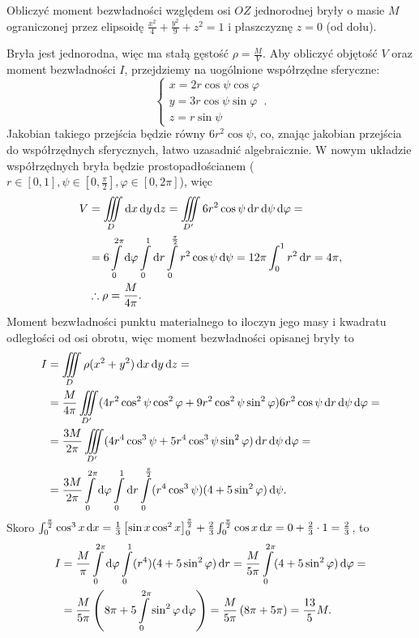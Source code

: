 \begin{example}
    Obliczyć moment bezwładności względem osi $OZ$ jednorodnej bryły o masie $M$ ograniczonej przez elipsoidę $\frac{x^2}{4} + \frac{y^2}{9} + z^2 = 1$ i płaszczyznę $z = 0$ (od dołu).
\end{example}
\begin{solution}
    Bryła jest jednorodna, więc ma stałą gęstość $\rho = \frac{M}{V}$. Aby obliczyć objętość $V$ oraz moment bezwładności $I$, przejdziemy na uogólnione współrzędne sferyczne:
    \[ \begin{cases}
        x = 2r\cos\psi\cos\varphi \\
        y = 3r\cos\psi\sin\varphi \\
        z = r\sin\psi
    \end{cases}. \]
    Jakobian takiego przejścia będzie równy $6r^2\cos\psi$, co, znając jakobian przejścia do współrzędnych sferycznych, łatwo uzasadnić algebraicznie. W nowym układzie współrzędnych bryła będzie prostopadłościanem ($r \in [0, 1], \psi \in [0, \frac{\pi}{2}], \varphi \in [0, 2\pi]$), więc
    \begin{align*}
        V &= \iiint\limits_D \d x \d y \d z = \iiint\limits_{D'} 6r^2\cos\psi \d r \d \psi \d \varphi = \\
        &= 6 \int\limits_0^{2\pi} \d \varphi \int\limits_0^1 \d r \int\limits_0^{\frac{\pi}{2}} r^2\cos\psi \d \psi = 12\pi \int_0^1 r^2 \d r = 4\pi, \\
        &\therefore \rho = \frac{M}{4\pi}.
    \end{align*}
    Moment bezwładności punktu materialnego to iloczyn jego masy i kwadratu odległości od osi obrotu, więc moment bezwładności opisanej bryły to
    \begin{align*}
        I &= \iiint\limits_D \rho (x^2 + y^2) \d x \d y \d z = \\
        &= \frac{M}{4\pi} \iiint\limits_{D'} (4r^2\cos^2\psi\cos^2\varphi + 9r^2\cos^2\psi\sin^2\varphi) 6r^2\cos\psi \d r \d \psi \d \varphi = \\
        &= \frac{3M}{2\pi} \iiint\limits_{D'} (4r^4\cos^3\psi + 5r^4\cos^3\psi\sin^2\varphi) \d r \d \psi \d \varphi = \\
        &= \frac{3M}{2\pi} \int\limits_0^{2\pi} \d \varphi \int\limits_0^1 \d r \int\limits_0^{\frac{\pi}{2}} (r^4\cos^3\psi)(4 + 5\sin^2\varphi) \d \psi.
    \end{align*}
    Skoro $\int_0^{\frac{\pi}{2}} \cos^3 x \operatorname{d}\!{x} = \frac{1}{3}\left[\sin x \cos^2 x\right]_0^{\frac{\pi}{2}} + \frac{2}{3}\int_0^{\frac{\pi}{2}} \cos x \operatorname{d}\!{x} = 0 + \frac{2}{3}\cdot 1 = \frac{2}{3}$, to
    \begin{align*}
        I &= \frac{M}{\pi} \int\limits_0^{2\pi} \operatorname{d}\!{\varphi} \int\limits_0^1 (r^4)(4 + 5\sin^2\varphi) \operatorname{d}\!{r} = \frac{M}{5\pi} \int\limits_0^{2\pi} (4 + 5\sin^2\varphi) \operatorname{d}\!{\varphi} = \\
        &= \frac{M}{5\pi}\left(8\pi + 5\int\limits_0^{2\pi} \sin^2 \varphi \operatorname{d}\!{\varphi}\right) = \frac{M}{5\pi}\left(8\pi + 5\pi\right) = \frac{13}{5} M.
    \end{align*}
\end{solution}

